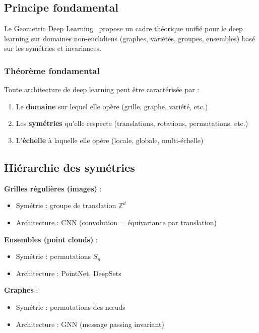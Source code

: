 \subsection{Principe fondamental}

Le Geometric Deep Learning~\cite{Bronstein2021} propose un cadre théorique unifié pour le deep learning sur domaines non-euclidiens (graphes, variétés, groupes, ensembles) basé sur les symétries et invariances.

\subsubsection{Théorème fondamental}

Toute architecture de deep learning peut être caractérisée par :
\begin{enumerate}
    \item Le \textbf{domaine} sur lequel elle opère (grille, graphe, variété, etc.)
    \item Les \textbf{symétries} qu'elle respecte (translations, rotations, permutations, etc.)
    \item L'\textbf{échelle} à laquelle elle opère (locale, globale, multi-échelle)
\end{enumerate}

\subsection{Hiérarchie des symétries}

\textbf{Grilles régulières (images)} :
\begin{itemize}
    \item Symétrie : groupe de translation $\mathbb{Z}^d$
    \item Architecture : CNN (convolution = équivariance par translation)
\end{itemize}

\textbf{Ensembles (point clouds)} :
\begin{itemize}
    \item Symétrie : permutations $S_n$
    \item Architecture : PointNet, DeepSets
\end{itemize}

\textbf{Graphes} :
\begin{itemize}
    \item Symétrie : permutations des nœuds
    \item Architecture : GNN (message passing invariant)
\end{itemize}

